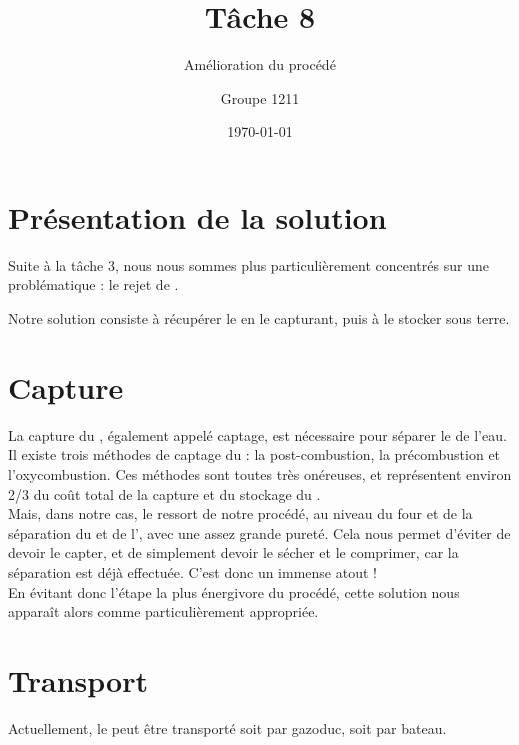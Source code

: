 \documentclass[10pt, a4, oneside, headings=normal]{scrartcl}
\begin{document}
\titlehead{}
\subject{}
\title{Tâche 8}
\subtitle{Amélioration du procédé}
\author{Groupe 1211}
\publishers{}
\date{\today}

\dedication{}

\maketitle


\section{Présentation de la solution}
Suite à la tâche 3, nous nous sommes plus particulièrement concentrés sur une problématique :  le rejet de .

Notre solution consiste à récupérer le  en le capturant, puis à le stocker sous terre. 


\section{Capture}
La capture du , également appelé captage, est nécessaire pour séparer le  de l'eau. \cite{giec} \cite{greenfacts} \cite{total} \cite{book1} \cite{book2}
\\

Il existe trois méthodes de captage du  : la post-combustion, la précombustion et l'oxycombustion. Ces méthodes sont toutes très onéreuses, et représentent environ 2/3 du coût total de la capture et du stockage du .
\\

Mais, dans notre cas, le  ressort de notre procédé, au niveau du four et de la séparation du  et de l', avec une assez grande pureté. Cela nous permet d'éviter de devoir le capter, et de simplement devoir le sécher et le comprimer, car la séparation est déjà effectuée. C'est donc un immense atout !
\\

En évitant donc l'étape la plus énergivore du procédé, cette solution nous apparaît alors comme particulièrement appropriée.

\section{Transport}
Actuellement, le  peut être transporté soit par gazoduc, soit par bateau.
\\
\end{document}
